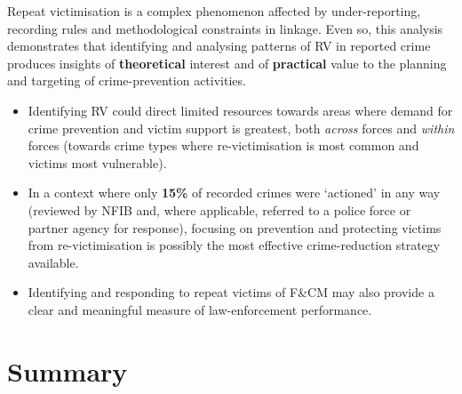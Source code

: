 \documentclass[11pt,a4paper,openany]{report}
\theoremstyle{definition}
\theoremstyle{plain}
\theoremstyle{remark}
\begin{document}
Repeat victimisation is a complex phenomenon affected by under-reporting, recording rules and methodological constraints in linkage. Even so, this analysis demonstrates that identifying and analysing patterns of RV in reported crime produces insights of \textbf{theoretical} interest and of \textbf{practical} value to the planning and targeting of crime-prevention activities.

\begin{itemize}
    \item Identifying RV could direct limited resources towards areas where demand for crime prevention and victim support is greatest, both \textit{across} forces and \textit{within} forces (towards crime types where re-victimisation is most common and victims most vulnerable).
    \item In a context where only \textbf{15\%} of recorded crimes were `actioned' in any way (reviewed by NFIB and, where applicable, referred to a police force or partner agency for response), focusing on prevention and protecting victims from re-victimisation is possibly the most effective crime-reduction strategy available.
    \item Identifying and responding to repeat victims of F\&CM may also provide a clear and meaningful measure of law-enforcement performance.
\end{itemize}

\section{Summary}
\end{document}

